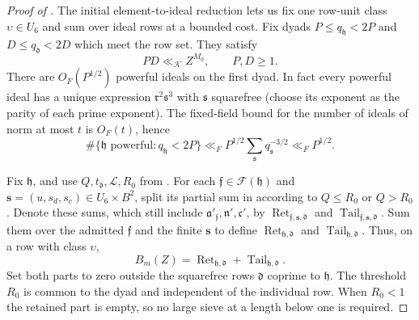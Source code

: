 \begin{proof}[Proof of ]
The initial element-to-ideal reduction lets us fix one row-unit class
\(\upsilon\in U_6\) and sum over ideal rows at a bounded cost.
Fix dyads $P\leq q_{\mathfrak h}<2P$ and
$D\leq q_{\mathfrak d}<2D$ which meet the row set.  They satisfy
\begin{equation}\label{eq:reflection-PD-range}
 PD\ll_{\mathscr K}Z^{M_0},\qquad P,D\geq1.
\end{equation}
There are $O_F(P^{1/2})$ powerful ideals on the first dyad.  In fact every
powerful ideal has a unique expression $\mathfrak r^2\mathfrak s^3$ with
$\mathfrak s$ squarefree (choose its exponent as the parity of each prime
exponent).  The fixed-field bound for the number of ideals of norm at most
$t$ is $O_F(t)$, hence
\begin{equation}\label{eq:reflection-powerful-count}
 \#\{\mathfrak h\text{ powerful}:q_{\mathfrak h}<2P\}
 \ll_F P^{1/2}\sum_{\mathfrak s}q_{\mathfrak s}^{-3/2}
 \ll_F P^{1/2}.
\end{equation}

Fix \(\mathfrak h\), and use \(Q,t_{\mathfrak d},\mathcal L,R_0\) from
.  For each
\(\mathfrak f\in\mathcal F(\mathfrak h)\) and
\(\mathbf s=(u,s_d,s_c)\in U_6\times B^2\), split its partial sum in
 according to \(Q\le R_0\) or
\(Q>R_0\).  Denote these sums, which still include
\(\mathfrak a'_{\mathfrak f},\mathfrak n',\mathfrak c'\), by
\(\operatorname{Ret}_{\mathfrak f,\mathbf s,\mathfrak d}\) and
\(\operatorname{Tail}_{\mathfrak f,\mathbf s,\mathfrak d}\).
Sum them over the admitted \(\mathfrak f\) and the finite \(\mathbf s\)
to define \(\operatorname{Ret}_{\mathfrak h,\mathfrak d}\) and
\(\operatorname{Tail}_{\mathfrak h,\mathfrak d}\).  Thus, on a row with
class \(\upsilon\),
\[
 B_m(Z)=\operatorname{Ret}_{\mathfrak h,\mathfrak d}
          +\operatorname{Tail}_{\mathfrak h,\mathfrak d}.
\]
Set both parts to zero outside the squarefree rows
\(\mathfrak d\) coprime to \(\mathfrak h\).  The threshold \(R_0\) is
common to the dyad and independent of the individual row.  When \(R_0<1\)
the retained part is empty, so no large sieve at a length below one is
required.


\end{proof}
